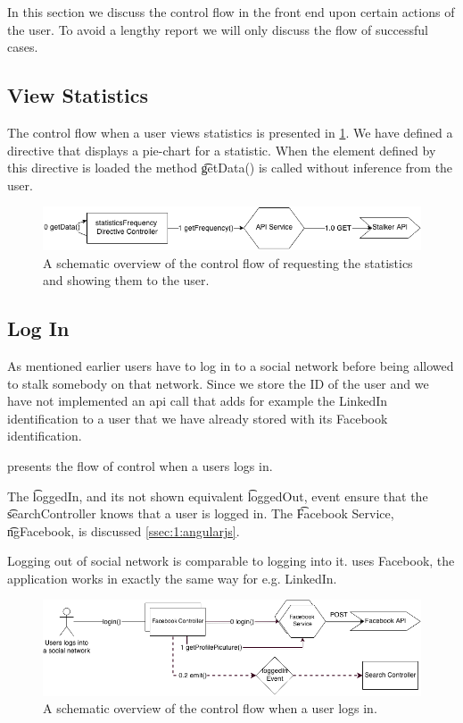 In this section we discuss the control flow in the front end upon certain actions of the user. To avoid a lengthy report we will only discuss the flow of successful cases.

\subsection{View Statistics}
	The control flow when a user views statistics is presented in \cref{fig:1:controlflowStat}. We have defined a directive that displays a pie-chart for a statistic. When the element defined by this directive is loaded the method \t{getData()} is called without inference from the user. 

	\begin{figure}
		\includegraphics[width=\textwidth]{./img/1_statistics_flow}
		\caption{A schematic overview of the control flow of requesting the statistics and showing them to the user.}
		\label{fig:1:controlflowStat}
	\end{figure}

\subsection{Log In}
\label{ss:1:login}
	As mentioned earlier users have to log in to a social network before being allowed to stalk somebody on that network. Since we store the ID of the user and we have not implemented an api call that adds for example the LinkedIn identification to a user that we have already stored with its Facebook identification.

	 presents the flow of control when a users logs in.

	The \t{loggedIn}, and its not shown equivalent \t{loggedOut}, event ensure that the \t{searchController} knows that a user is logged in. The \t{Facebook Service}, \t{ngFacebook}, is discussed \vref{ssec:1:angularjs}. 

	Logging out of social network is comparable to logging into it.  uses Facebook, the application works in exactly the same way for e.g. LinkedIn.

	\begin{figure}
		\includegraphics[width=\textwidth]{./img/1_login_flow}
		\caption{A schematic overview of the control flow when a user logs in.}
		\label{fig:1:controlflowLogIn}
	\end{figure}	

